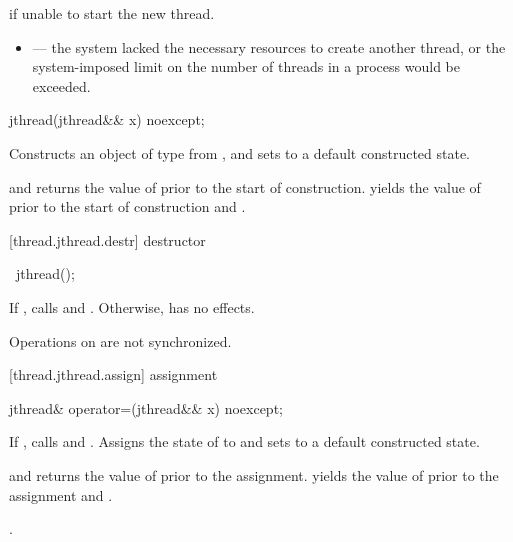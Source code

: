 \begin{itemdescr}
\pnum\throws {} if unable to start the new thread.

\pnum\errors
\begin{itemize}
\item {} --- the system lacked the necessary
resources to create another thread, or the system-imposed limit on the number of
threads in a process would be exceeded.
\end{itemize}
\end{itemdescr}

%
\begin{itemdecl}
jthread(jthread&& x) noexcept;
\end{itemdecl}

\begin{itemdescr}
\pnum
\effects Constructs an object of type  from , and sets
 to a default constructed state.

\pnum
\postconditions {} and  returns the
value of  prior to the start of construction.
{\color{diffcolor}
 yields the value of  prior to the start of construction
and .
}%

\end{itemdescr}

[thread.jthread.destr]{ destructor}

%
\begin{itemdecl}
~jthread();
\end{itemdecl}

{\color{diffcolor}
\begin{itemdescr}
\pnum
If , calls  and .
Otherwise, has no effects.
\begin{note} Operations on  are not synchronized. \end{note}
\end{itemdescr}
}%

[thread.jthread.assign]{ assignment}

%
\begin{itemdecl}
jthread& operator=(jthread&& x) noexcept;
\end{itemdecl}

\begin{itemdescr}
\pnum
\effects If , calls  and .
Assigns the
state of  to  and sets  to a default constructed state.

{\color{diffcolor}
\pnum
\postconditions {} and  returns the value of
 prior to the assignment.
 yields the value of  prior to the assignment
and .
}%

\pnum
\returns {}.
\end{itemdescr}


